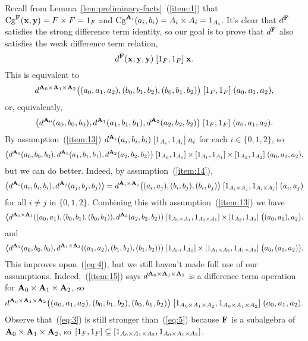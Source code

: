 Recall from Lemma~\ref{lem:preliminary-facts}~(\ref{item:1}) that
$\operatorname{Cg}^{\mathbf{F}}(\mathbf{x}, \mathbf{y}) = F\times F = 1_F$ and
$\operatorname{Cg}^{\mathbf{A}_i}(a_i, b_i) = A_i \times A_i = 1_{A_i}$.
It's clear that $d^{\mathbf{F}}$ satisfies the strong difference term identity, so 
our goal is to prove that $d^{\mathbf{F}}$ also satisfies the weak difference term relation,
\begin{equation}
  \label{eq:3}  
  d^{\mathbf{F}}(\mathbf{x}, \mathbf{y}, \mathbf{y}) \mathrel{[1_F, 1_F]} \mathbf{x}.
\end{equation}
This is equivalent to
\begin{equation*}
  d^{\mathbf{A}_0\times \mathbf{A}_1 \times \mathbf{A}_2}\bigl((a_0, a_1, a_2), (b_0, b_1, b_2), (b_0, b_1, b_2)\bigr)
  \mathrel{[1_{F}, 1_{F}]} (a_0, a_1, a_2),
\end{equation*}
or, equivalently,
\begin{equation*}
\bigl(d^{\mathbf{A}_0}(a_0, b_0, b_0), d^{\mathbf{A}_1}(a_1, b_1, b_1), d^{\mathbf{A}_2}(a_2, b_2, b_2)\bigr)
 \mathrel{[1_F, 1_F]} (a_0, a_1, a_2).
\end{equation*}
By assumption~(\ref{item:13}) $d^{\mathbf{A}_i}(a_i, b_i, b_i) \mathrel{[1_{A_i}, 1_{A_i}]} a_i$ for
each $i \in \{0,1,2\}$, so
\begin{equation}
  \label{eq:4}
\bigl(d^{\mathbf{A}_0}(a_0, b_0, b_0), d^{\mathbf{A}_1}(a_1, b_1, b_1), d^{\mathbf{A}_2}(a_2, b_2, b_2)\bigr)
 \mathrel{[1_{A_0}, 1_{A_0}] \times  [1_{A_1}, 1_{A_1}] \times [1_{A_2}, 1_{A_2}]} (a_0, a_1, a_2),
\end{equation}
but we can do better.
Indeed, by assumption~(\ref{item:14}),
\[
\bigl(d^{\mathbf{A}_i}(a_i, b_i, b_i), d^{\mathbf{A}_j}(a_j, b_j, b_j)\bigr)
=d^{\mathbf{A}_i\times \mathbf{A}_j}\bigl((a_i, a_j), (b_i,b_j), (b_i, b_j)\bigr)
\mathrel{[1_{A_i\times A_j}, 1_{A_i\times A_j}]} (a_i, a_j)
\]
for all $i\neq j$ in $\{0,1,2\}$.
Combining this with assumption~(\ref{item:13}) we have
\[
\bigl(d^{\mathbf{A}_0\times \mathbf{A}_1}((a_0, a_1), (b_0,b_1), (b_0, b_1)),
d^{\mathbf{A}_2}(a_2, b_2,b_2)\bigr)
\mathrel{[1_{A_0\times A_1}, 1_{A_0\times A_1}] \times [1_{A_2}, 1_{A_2}]}
\bigl((a_0, a_1),a_2\bigr).
\]
and 
\[
\bigl(d^{\mathbf{A}_0}(a_0, b_0, b_0), d^{\mathbf{A}_1\times \mathbf{A}_2}((a_1, a_2), (b_1,b_2), (b_1, b_2))\bigr)
\mathrel{[1_{A_0}, 1_{A_0}] \times [1_{A_1\times A_2}, 1_{A_1\times A_2}]} \bigl(a_0, (a_1, a_2)\bigr).
\]
This improves upon~(\ref{eq:4}), but we still haven't made full use of our
assumptions.
Indeed,~(\ref{item:15}) says
$d^{\mathbf{A}_0\times \mathbf{A}_1 \times \mathbf{A}_2}$ is a difference term operation for 
$\mathbf{A}_0\times \mathbf{A}_1 \times \mathbf{A}_2$, so
\begin{equation}
    \label{eq:5}
  d^{\mathbf{A}_0\times \mathbf{A}_1 \times \mathbf{A}_2}\bigl((a_0, a_1, a_2), (b_0, b_1, b_2), (b_0, b_1, b_2)\bigr)
  \mathrel{[1_{A_0\times A_1\times A_2}, 1_{A_0\times A_1\times A_2}]} (a_0, a_1, a_2).
\end{equation}
Observe that~(\ref{eq:3}) is still stronger than~(\ref{eq:5})
because $\mathbf{F}$ is a subalgebra of $\mathbf{A}_0\times \mathbf{A}_1 \times \mathbf{A}_2$, so 
$[1_F, 1_F] \subseteq [1_{A_0\times A_1\times A_2}, 1_{A_0\times A_1\times A_2}]$.

